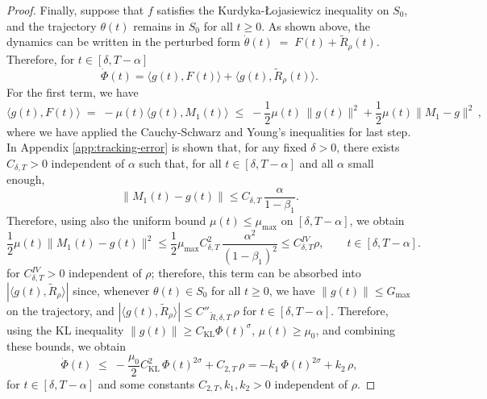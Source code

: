 \documentclass{article} %
\begin{document}
\begin{proof}
Finally, suppose that $f$ satisfies the Kurdyka-Łojasiewicz inequality on $S_0$, and the trajectory $\theta(t)$ remains in $S_0$ for all $t\ge0$.  As shown above, the dynamics can be written in the perturbed form $\dot\theta(t) \;=\; F(t) + \widetilde R_\rho(t)$. Therefore, for $t\in[\delta,T-\alpha]$
\[
\dot\Phi(t) = \langle g(t),F(t)\rangle + \langle g(t),\widetilde R_\rho(t)\rangle.
\]
For the first term, we have 
\[
\langle g(t),F(t)\rangle  \;=\; -\mu(t)\langle g(t), M_1(t) \rangle  \;\le\; -\frac{1}{2}\mu (t)\,\|g(t)\|^2 + \frac{1}{2}\mu(t) \| M_1-g \|^2\,,
\]
where we have applied the Cauchy-Schwarz and Young's inequalities for last step. In Appendix \ref{app:tracking-error} is shown that, for any fixed $\delta>0$, there exists
$C_{\delta,T}>0$ independent of $\alpha$ such that, for all $t\in[\delta,T-\alpha]$ and all $\alpha$ small enough,
\begin{equation}\label{eq:M1-tracking-alpha}
\|M_1(t)-g(t)\|\le C_{\delta,T}\,\frac{\alpha}{1-\beta_1}.
\end{equation}
Therefore, using also the uniform bound $\mu(t)\le \mu_{\max}$ on $[\delta,T-\alpha]$, we obtain
\begin{equation}\label{eq:M1-tracking-alpha2}
\frac{1}{2}\mu(t)\|M_1(t)-g(t)\|^2
\le \frac{1}{2}\mu_{\max} C_{\delta,T}^2\,\frac{\alpha^2}{(1-\beta_1)^2} \leq C^{IV}_{\delta,T} \rho,
\qquad t\in[\delta,T-\alpha].
\end{equation}
for $C^{IV}_{\delta,T}>0$ independent of $\rho$; therefore, this term can be absorbed into $|\langle g(t),\widetilde R_\rho\rangle|$ since, whenever $\theta(t)\in S_0$ for all $t\ge0$, we have $\|g(t)\|\le G_{\max}$ on the trajectory, and $|\langle g(t),\widetilde R_\rho\rangle| \leq C''_{\widetilde R,\delta,T}\,\rho$ for $t\in[\delta,T-\alpha]$. Therefore, using the KL inequality $\|g(t)\|\ge C_{\mathrm{KL}}\Phi(t)^{\sigma}$, $\mu(t) \geq \mu_0$, and combining these bounds, we obtain
\[
\dot\Phi(t)
\;\le\;
-\frac{\mu_0}{2} C_{\mathrm{KL}}^2\,\Phi(t)^{2\sigma}
+ C_{2,T}\,\rho
= -k_1\,\Phi(t)^{2\sigma} + k_2\,\rho,
\]
for $t\in[\delta,T-\alpha]$ and some constants $C_{2,T}, k_1,k_2>0$ independent of $\rho$. 


\end{proof}
\end{document}
